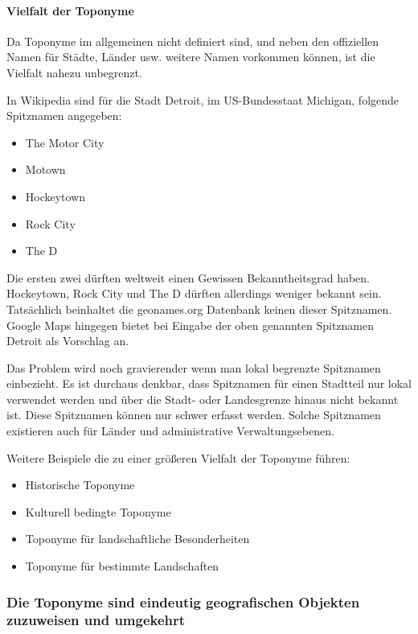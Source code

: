 				\paragraph{Vielfalt der Toponyme} 

					Da Toponyme im allgemeinen nicht definiert sind, und neben den offiziellen Namen für Städte, Länder usw. weitere Namen vorkommen können, ist die Vielfalt nahezu unbegrenzt.
					
					In Wikipedia sind für die Stadt Detroit, im US-Bundesstaat Michigan, folgende Spitznamen angegeben:
					
					\begin{itemize}
						\item The Motor City
						\item Motown
						\item Hockeytown
						\item Rock City
						\item The D
					\end{itemize}

					Die ersten zwei dürften weltweit einen Gewissen Bekanntheitsgrad haben. 
					Hockeytown, Rock City und The D dürften allerdings weniger bekannt sein.
					Tatsächlich beinhaltet die geonames.org Datenbank keinen dieser Spitznamen.
					Google Maps hingegen bietet bei Eingabe der oben genannten Spitznamen Detroit als Vorschlag an.

					Das Problem wird noch gravierender wenn man lokal begrenzte Spitznamen einbezieht.
					Es ist durchaus denkbar, dass Spitznamen für einen Stadtteil nur lokal verwendet werden und über die Stadt- oder Landesgrenze hinaus nicht bekannt ist. 
					Diese Spitznamen können nur schwer erfasst werden.
					Solche Spitznamen existieren auch für Länder und administrative Verwaltungsebenen. 

					Weitere Beispiele die zu einer größeren Vielfalt der Toponyme führen:

					\begin{itemize}
						\item Historische Toponyme
						\item Kulturell bedingte Toponyme
						\item Toponyme für landschaftliche Besonderheiten
						\item Toponyme für bestimmte Landschaften
					\end{itemize}
		
			\subsubsection{Die Toponyme sind eindeutig geografischen Objekten zuzuweisen und umgekehrt} 

